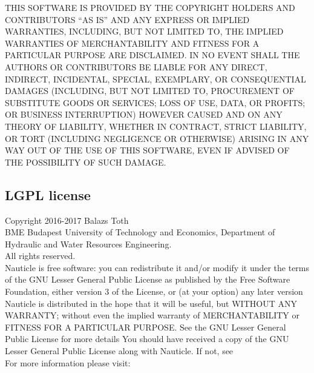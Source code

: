\documentclass[a4paper,12pt,openany]{book}
\newcommand{\myhref}[3][nauticlegreen_dark]{\href{#2}{\color{#1}{#3}}}%
\theoremstyle{break}
\begin{document}
THIS SOFTWARE IS PROVIDED BY THE COPYRIGHT HOLDERS AND CONTRIBUTORS “AS IS” AND ANY EXPRESS OR IMPLIED WARRANTIES, INCLUDING, BUT NOT LIMITED TO, THE IMPLIED WARRANTIES OF MERCHANTABILITY AND FITNESS FOR A PARTICULAR PURPOSE ARE DISCLAIMED. IN NO EVENT SHALL THE AUTHORS OR CONTRIBUTORS BE LIABLE FOR ANY DIRECT, INDIRECT, INCIDENTAL, SPECIAL, EXEMPLARY, OR CONSEQUENTIAL DAMAGES (INCLUDING, BUT NOT LIMITED TO, PROCUREMENT OF SUBSTITUTE GOODS OR SERVICES; LOSS OF USE, DATA, OR PROFITS; OR BUSINESS INTERRUPTION) HOWEVER CAUSED AND ON ANY THEORY OF LIABILITY, WHETHER IN CONTRACT, STRICT LIABILITY, OR TORT (INCLUDING NEGLIGENCE OR OTHERWISE) ARISING IN ANY WAY OUT OF THE USE OF THIS SOFTWARE, EVEN IF ADVISED OF THE POSSIBILITY OF SUCH DAMAGE.

\subsection{LGPL license}
\noindent
Copyright \textcopyright{} 2016-2017 Balazs Toth \\
\noindent
BME Budapest University of Technology and Economics, Department of Hydraulic and Water Resources Engineering.\\
All rights reserved. \\
Nauticle is free software: you can redistribute it and/or modify it under the terms of the GNU Lesser General Public License as published by the Free Software Foundation, either version 3 of the License, or (at your option) any later version Nauticle is distributed in the hope that it will be useful, but WITHOUT ANY WARRANTY; without even the implied warranty of MERCHANTABILITY or FITNESS FOR A PARTICULAR PURPOSE.  See the GNU Lesser General Public License for more details You should have received a copy of the GNU Lesser General Public License along with Nauticle.  If not, see \myhref{http://www.gnu.org/licenses/}{http://www.gnu.org/licenses/}\\
 For more information please visit: \myhref{https://bitbucket.org/Nauticleproject/}{https://bitbucket.org/Nauticleproject/}
\end{document}
